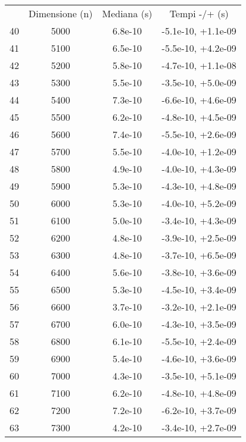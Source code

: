 \begin{table}
\centering
\begin{adjustbox}{width=1\textwidth/2}
\begin{tabular}{|c|c|c|c|}
\hline
 & Dimensione (n) & Mediana (s) & Tempi -/+ (s) \\
40 & 5000 & 6.8e-10 & -5.1e-10, +1.1e-09 \\
\cline{1-4}
41 & 5100 & 6.5e-10 & -5.5e-10, +4.2e-09 \\
\cline{1-4}
42 & 5200 & 5.8e-10 & -4.7e-10, +1.1e-08 \\
\cline{1-4}
43 & 5300 & 5.5e-10 & -3.5e-10, +5.0e-09 \\
\cline{1-4}
44 & 5400 & 7.3e-10 & -6.6e-10, +4.6e-09 \\
\cline{1-4}
45 & 5500 & 6.2e-10 & -4.8e-10, +4.5e-09 \\
\cline{1-4}
46 & 5600 & 7.4e-10 & -5.5e-10, +2.6e-09 \\
\cline{1-4}
47 & 5700 & 5.5e-10 & -4.0e-10, +1.2e-09 \\
\cline{1-4}
48 & 5800 & 4.9e-10 & -4.0e-10, +4.3e-09 \\
\cline{1-4}
49 & 5900 & 5.3e-10 & -4.3e-10, +4.8e-09 \\
\cline{1-4}
50 & 6000 & 5.3e-10 & -4.0e-10, +5.2e-09 \\
\cline{1-4}
51 & 6100 & 5.0e-10 & -3.4e-10, +4.3e-09 \\
\cline{1-4}
52 & 6200 & 4.8e-10 & -3.9e-10, +2.5e-09 \\
\cline{1-4}
53 & 6300 & 4.8e-10 & -3.7e-10, +6.5e-09 \\
\cline{1-4}
54 & 6400 & 5.6e-10 & -3.8e-10, +3.6e-09 \\
\cline{1-4}
55 & 6500 & 5.3e-10 & -4.5e-10, +3.4e-09 \\
\cline{1-4}
56 & 6600 & 3.7e-10 & -3.2e-10, +2.1e-09 \\
\cline{1-4}
57 & 6700 & 6.0e-10 & -4.3e-10, +3.5e-09 \\
\cline{1-4}
58 & 6800 & 6.1e-10 & -5.5e-10, +2.4e-09 \\
\cline{1-4}
59 & 6900 & 5.4e-10 & -4.6e-10, +3.6e-09 \\
\cline{1-4}
60 & 7000 & 4.3e-10 & -3.5e-10, +5.1e-09 \\
\cline{1-4}
61 & 7100 & 6.2e-10 & -4.8e-10, +4.8e-09 \\
\cline{1-4}
62 & 7200 & 7.2e-10 & -6.2e-10, +3.7e-09 \\
\cline{1-4}
63 & 7300 & 4.2e-10 & -3.4e-10, +2.7e-09 \\

\end{tabular}
\end{adjustbox}
\end{table}

